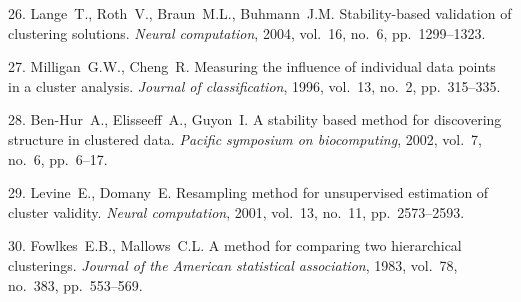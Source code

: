 {26. Lange~T., Roth~V., Braun~M.\:L., Buhmann~J.\:M.
Stability-based validation of clustering solutions. {\it Neural
computation}, 2004, vol.~16, no.~6, pp.~1299--1323.

27. Milligan~G.\:W., Cheng~R. Measuring the influence of
individual data points in a cluster analysis. {\it Journal of
classification}, 1996, vol.~13, no.~2, pp.~315--335.

28. Ben-Hur~A., Elisseeff~A., Guyon~I. A stability based method
for discovering structure in clustered data. {\it Pacific
symposium on biocomputing}, 2002, vol.~7, no.~6, pp.~6--17.

29. Levine~E., Domany~E. Resampling method for unsupervised
estimation of cluster validity. {\it Neural computation}, 2001,
vol.~13, no.~11, pp.~2573--2593.

30. Fowlkes~E.\:B., Mallows~C.\:L. A method for comparing two
hierarchical clusterings. {\it Journal of the American statistical
association}, 1983, vol.~78, no.~383, pp.~553--569.





}
